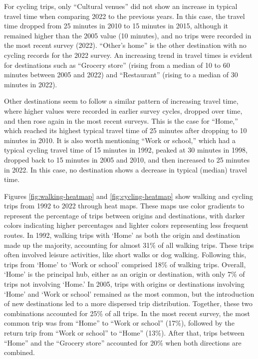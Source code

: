 \documentclass[preprint, 3p,
authoryear]{elsarticle} %
\begin{document}
For cycling trips, only ``Cultural venues'' did not show an increase in
typical travel time when comparing 2022 to the previous years. In this
case, the travel time dropped from 25 minutes in 2010 to 15 minutes in
2015, although it remained higher than the 2005 value (10 minutes), and
no trips were recorded in the most recent survey (2022). ``Other's
home'' is the other destination with no cycling records for the 2022
survey. An increasing trend in travel times is evident for destinations
such as ``Grocery store'' (rising from a median of 10 to 60 minutes
between 2005 and 2022) and ``Restaurant'' (rising to a median of 30
minutes in 2022).

Other destinations seem to follow a similar pattern of increasing travel
time, where higher values were recorded in earlier survey cycles,
dropped over time, and then rose again in the most recent surveys. This
is the case for ``Home,'' which reached its highest typical travel time
of 25 minutes after dropping to 10 minutes in 2010. It is also worth
mentioning ``Work or school,'' which had a typical cycling travel time
of 15 minutes in 1992, peaked at 30 minutes in 1998, dropped back to 15
minutes in 2005 and 2010, and then increased to 25 minutes in 2022. In
this case, no destination shows a decrease in typical (median) travel
time.

Figures \ref{fig:walking-heatmap} and \ref{fig:cycling-heatmap} show
walking and cycling trips from 1992 to 2022 through heat maps. These
maps use color gradients to represent the percentage of trips between
origins and destinations, with darker colors indicating higher
percentages and lighter colors representing less frequent routes. In
1992, walking trips with `Home' as both the origin and destination made
up the majority, accounting for almost 31\% of all walking trips. These
trips often involved leisure activities, like short walks or dog
walking. Following this, trips from `Home' to `Work or school' comprised
18\% of walking trips. Overall, `Home' is the principal hub, either as
an origin or destination, with only 7\% of trips not involving `Home.'
In 2005, trips with origins or destinations involving `Home' and `Work
or school' remained as the most common, but the introduction of new
destinations led to a more dispersed trip distribution. Together, these
two combinations accounted for 25\% of all trips. In the most recent
survey, the most common trip was from ``Home'' to ``Work or school''
(17\%), followed by the return trip from ``Work or school'' to ``Home''
(13\%). After that, trips between ``Home'' and the ``Grocery store''
accounted for 20\% when both directions are combined.
\end{document}
